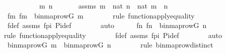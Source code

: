 \begin{isabellebody}
\ \ \isamarkupfalse%
{\isacharminus}{\kern0pt}\ \isanewline
\ \ \ \ \isamarkupfalse%
\ m\ n\ \isanewline
\ \ \ \ \isamarkupfalse%
\ assms{}{\isacharcolon}{\kern0pt}\ {\isachardoublequoteopen}m\ {\isasymin}\ nat{\isachardoublequoteclose}\ {\isachardoublequoteopen}n\ {\isasymin}\ nat{\isachardoublequoteclose}\ {\isachardoublequoteopen}m\ {\isasymnoteq}\ n{\isachardoublequoteclose}\ \isanewline
\ \ \ \ \isamarkupfalse%
\ fm{\isacharcolon}{\kern0pt}\ {\isachardoublequoteopen}f{\isacharbackquote}{\kern0pt}m\ {\isacharequal}{\kern0pt}\ binmap{\isacharunderscore}{\kern0pt}row{\isacharparenleft}{\kern0pt}G{\isacharcomma}{\kern0pt}\ m{\isacharparenright}{\kern0pt}{\isachardoublequoteclose}\ \isanewline
\ \ \ \ \ \ \isamarkupfalse%
{\isacharparenleft}{\kern0pt}rule\ function{\isacharunderscore}{\kern0pt}apply{\isacharunderscore}{\kern0pt}equality{\isacharparenright}{\kern0pt}\isanewline
\ \ \ \ \ \ \isamarkupfalse%
\ f{\isacharunderscore}{\kern0pt}def\ assms{}\ fpi\ Pi{\isacharunderscore}{\kern0pt}def\isanewline
\ \ \ \ \ \ \isamarkupfalse%
\ auto\isanewline
\isanewline
\ \ \ \ \isamarkupfalse%
\ fn{\isacharcolon}{\kern0pt}\ {\isachardoublequoteopen}f{\isacharbackquote}{\kern0pt}n\ {\isacharequal}{\kern0pt}\ binmap{\isacharunderscore}{\kern0pt}row{\isacharparenleft}{\kern0pt}G{\isacharcomma}{\kern0pt}\ n{\isacharparenright}{\kern0pt}{\isachardoublequoteclose}\ \isanewline
\ \ \ \ \ \ \isamarkupfalse%
{\isacharparenleft}{\kern0pt}rule\ function{\isacharunderscore}{\kern0pt}apply{\isacharunderscore}{\kern0pt}equality{\isacharparenright}{\kern0pt}\isanewline
\ \ \ \ \ \ \isamarkupfalse%
\ f{\isacharunderscore}{\kern0pt}def\ assms{}\ fpi\ Pi{\isacharunderscore}{\kern0pt}def\isanewline
\ \ \ \ \ \ \isamarkupfalse%
\ auto\isanewline
\isanewline
\ \ \ \ \isamarkupfalse%
\ {\isachardoublequoteopen}binmap{\isacharunderscore}{\kern0pt}row{\isacharparenleft}{\kern0pt}G{\isacharcomma}{\kern0pt}\ m{\isacharparenright}{\kern0pt}\ {\isasymnoteq}\ binmap{\isacharunderscore}{\kern0pt}row{\isacharparenleft}{\kern0pt}G{\isacharcomma}{\kern0pt}\ n{\isacharparenright}{\kern0pt}{\isachardoublequoteclose}\ \isanewline
\ \ \ \ \ \ \isamarkupfalse%
{\isacharparenleft}{\kern0pt}rule\ binmap{\isacharunderscore}{\kern0pt}row{\isacharunderscore}{\kern0pt}distinct{\isacharparenright}{\kern0pt}\isanewline
\ \ \ \ \ \ \isamarkupfalse%

\end{isabellebody}
